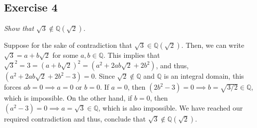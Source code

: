 \subsection*{Exercise 4}
\textit{Show that $\sqrt{3} \not\in \mathbb{Q}(\sqrt{2})$.}

\vspace{5 mm}
Suppose for the sake of contradiction that $\sqrt{3} \in \mathbb{Q}(\sqrt{2})$. Then, we can write $\sqrt{3} = a + b\sqrt{2}$ for some $a,b \in \mathbb{Q}$. This implies that $\sqrt{3}^2 = 3 = (a + b\sqrt{2})^2 = (a^2 + 2ab\sqrt{2} + 2b^2)$, and thus, $(a^2 + 2ab\sqrt{2} + 2b^2 - 3) = 0$. Since $\sqrt{2} \not\in \mathbb{Q}$ and $\mathbb{Q}$ is an integral domain, this forces $ab = 0 \implies a = 0$ or $b = 0$. If $a = 0$, then $(2b^2 - 3) = 0 \implies b = \sqrt{3/2} \in \mathbb{Q}$, which is impossible. On the other hand, if $b = 0$, then $(a^2 - 3) = 0 \implies a = \sqrt{3} \in \mathbb{Q}$, which is also impossible. We have reached our required contradiction and thus, conclude that $\sqrt{3} \not\in \mathbb{Q}(\sqrt{2})$.